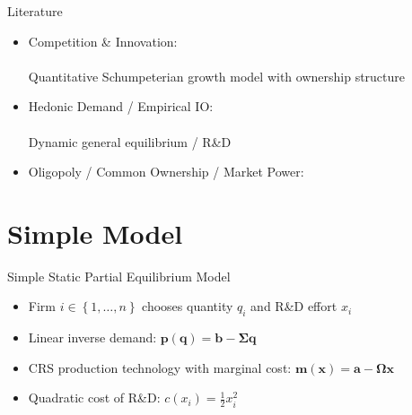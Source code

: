 \documentclass[
  aspectratio=169,  %
]{beamer}
\theoremstyle{plain}
\begin{document}
\begin{frame}{Literature}
  \begin{itemize}
    \item Competition \& Innovation: \\
          {\footnotesize\citet{d-Aspremont1988-je,Aghion2001-yc,Aghion2005-vw,Acemoglu2012-bj,Aghion2013-nq,Bloom2013-pn,Lopez2019-sl,Peters2020-sd,Akcigit2021-ns,Akcigit2023-zl,Liu2022-iw,Cavenaile2023-lo,Anton2023-ej,Anton2024-pw,Kini2024-kd,Hopenhayn2024-ya}}\\
          \textcolor{uclaBlue}{Quantitative Schumpeterian growth model with ownership structure}\\
    \item Hedonic Demand / Empirical IO: \\
          {\footnotesize\citet{Lancaster1966-sg,Rosen1974-ep,Berry1995-lx,Nevo2001-ja,Pellegrino2024-dn,Ederer2024-rw}}\\
          \textcolor{uclaBlue}{Dynamic general equilibrium / R\&D}
    \item Oligopoly / Common Ownership / Market Power: \\
          {\footnotesize\citet{Rubinstein1983-pi,Rotemberg1984-jz,Neary2003-sn,Atkeson2008-zc,Gutierrez2017-wl,He2017-ix,Azar2018-cc,Azar2022-cn,Autor2020-mr,Baqaee2020-eb,De_Loecker2020-jn,Azar2021-uh,Edmond2023-bg}}
  \end{itemize}
\end{frame}

\section{Simple Model}

\begin{frame}{Simple Static Partial Equilibrium Model}
  \begin{itemize}
    \item Firm $i\in \left\{1,\ldots, n\right\}$ chooses quantity $q_i$ and R\&D effort $x_i$
          \medskip{}
    \item Linear inverse demand: $\symbf{p}(\symbf{q}) = \symbf{b} - \symbf{\Sigma} \symbf{q}$\medskip{}
    \item CRS production technology with marginal cost: $\symbf{m}(\symbf{x}) = \symbf{a} - \symbf{\Omega} \symbf{x}$\medskip{}
    \item Quadratic cost of R\&D: $c(x_i) = \frac{1}{2}x_i^2$
  \end{itemize}
\end{frame}
\end{document}
